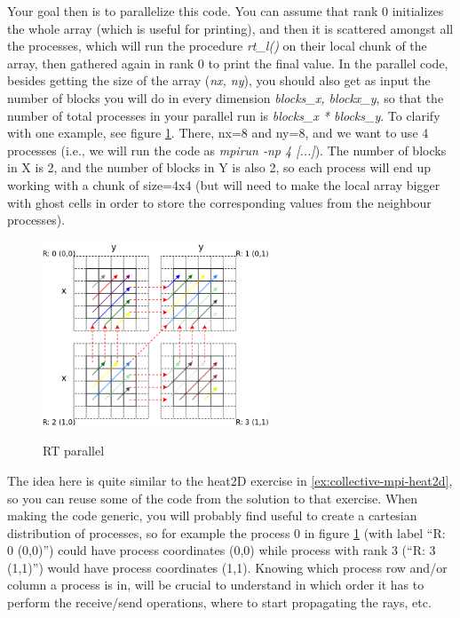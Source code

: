 Your goal then is to parallelize this code. You can assume that rank 0
initializes the whole array (which is useful for printing), and then it is
scattered amongst all the processes, which will run the procedure
\textit{rt\_l()} on their local chunk of the array, then gathered again in
rank 0 to print the final value. In the parallel code, besides getting the size
of the array (\textit{nx, ny}), you should also get as input the number of
blocks you will do in every dimension \textit{blocks\_x, blockx\_y}, so that the
number of total processes in your parallel run is \textit{blocks\_x *
  blocks\_y}. To clarify with one example, see figure \ref{fig:rt-par}. There,
nx=8 and ny=8, and we want to use 4 processes (i.e., we will run the code as
\textit{mpirun -np 4 [...]}). The number of blocks in X is 2, and the number of
blocks in Y is also 2, so each process will end up working with a chunk of
size=4x4 (but will need to make the local array bigger with ghost cells in order
to store the corresponding values from the neighbour processes).


\begin{figure}[!htbp]
  \centering
  \includegraphics[width=0.6\textwidth]{graphics/projects/rt-par.png}
  \label{fig:rt-par}
  \caption{RT parallel}
\end{figure}

The idea here is quite similar to the heat2D exercise in
\ref{ex:collective-mpi-heat2d}, so you can reuse some of the code from the
solution to that exercise. When making the code generic, you will probably find
useful to create a cartesian distribution of processes, so for example the
process 0 in figure \ref{fig:rt-par} (with label ``R: 0 (0,0)'') could have
process coordinates (0,0) while process with rank 3 (``R: 3 (1,1)'') would have
process coordinates (1,1). Knowing which process row and/or column a process is
in, will be crucial to understand in which order it has to perform the
receive/send operations, where to start propagating the rays, etc.

